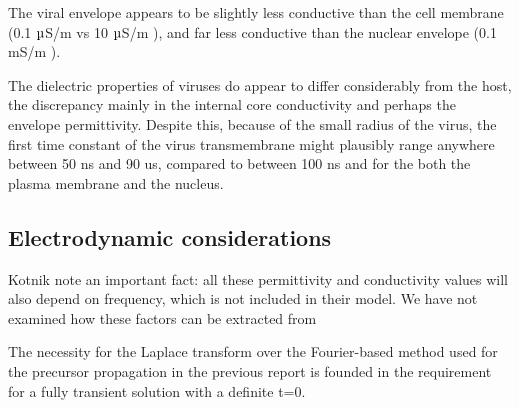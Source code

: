 \documentclass[fleqn,10pt]{article}
\begin{document}
The viral envelope appears to be slightly less conductive than the cell membrane (0.1 $\micro$S/m \cite{New1999} vs 10 $\micro$S/m \cite{Study2001}), and far less conductive than the nuclear envelope (0.1 $\text{m}$S/m \cite{Study2001}).


The dielectric properties of viruses do appear to differ considerably from the host, the discrepancy mainly in the internal core conductivity and perhaps the envelope permittivity. Despite this, because of the small radius of the virus, the first time constant of the virus transmembrane might plausibly range anywhere between 50 ns and 90 us, compared to between 100 ns and  for the both the plasma membrane and the nucleus.



\subsection{Electrodynamic considerations}

Kotnik note an important fact: all these permittivity and conductivity values will also depend on frequency, which is not included in their model. We have not examined how these factors can be extracted from 

The necessity for the Laplace transform over the Fourier-based method used for the precursor propagation in the previous report is founded in the requirement for a fully transient solution with a definite t=0.
\end{document}
